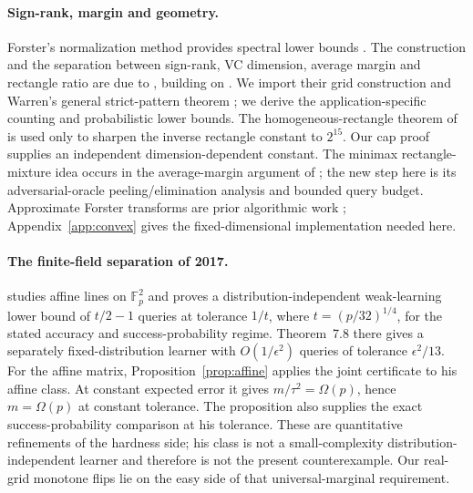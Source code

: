 \paragraph{Sign-rank, margin and geometry.}
Forster's normalization method provides spectral lower bounds \citep{Forster02}. The construction and the separation between sign-rank, VC dimension, average margin and rectangle ratio are due to \citet{HHPTZ22}, building on \citet{AMY16}. We import their grid construction and Warren's general strict-pattern theorem \citep{Warren68}; we derive the application-specific counting and probabilistic lower bounds. The homogeneous-rectangle theorem of \citet{APP05} is used only to sharpen the inverse rectangle constant to $2^{15}$. Our cap proof supplies an independent dimension-dependent constant. The minimax rectangle-mixture idea occurs in the average-margin argument of \citet[Theorem~3.1]{HHPTZ22}; the new step here is its adversarial-oracle peeling/elimination analysis and bounded query budget. Approximate Forster transforms are prior algorithmic work \citep{DKT22}; Appendix~\ref{app:convex} gives the fixed-dimensional implementation needed here.

\paragraph{The finite-field separation of 2017.}
\citet[Theorem~7.7]{Feldman17} studies affine lines on $\mathbb F_p^2$ and proves a distribution-independent weak-learning lower bound of $t/2-1$ queries at tolerance $1/t$, where $t=(p/32)^{1/4}$, for the stated accuracy and success-probability regime. Theorem~7.8 there gives a separately fixed-distribution learner with $O(1/\epsilon^2)$ queries of tolerance $\epsilon^2/13$. For the affine matrix, Proposition~\ref{prop:affine} applies the joint certificate to his affine class. At constant expected error it gives $m/\tau^2=\Omega(p)$, hence $m=\Omega(p)$ at constant tolerance. The proposition also supplies the exact success-probability comparison at his tolerance. These are quantitative refinements of the hardness side; his class is not a small-complexity distribution-independent learner and therefore is not the present counterexample. Our real-grid monotone flips lie on the easy side of that universal-marginal requirement.

